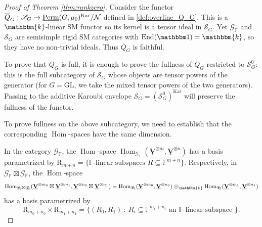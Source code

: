 \documentclass[11pt,a4paper]{amsart}
\theoremstyle{plain}%
\theoremstyle{definition}
\theoremstyle{remark}
\newcommand{\Hom}{\operatorname{Hom}}
\newcommand{\triv}{{\mathbbm 1}}
\newcommand{\End}{\operatorname{End}}
\newcommand{\V}{\mathbf{V}}
\newcommand{\Perm}{\underline{{\rm Perm}}}
\newcommand{\F}{{\mathbb F}}
\newcommand{\kk}{\mathbbm{k}}
\newcommand{\Kar}{\mathrm{Kar}}
\newcommand{\N}{\mathcal N}
\begin{document}
\begin{proof}[Proof of Theorem \ref{thm:rankzero}] 


Consider the functor $\overline{Q}_G: \mathscr{S}_G\to \Perm(G, \mu_0)^{\Kar}/\N$ defined in \cref{def:overline_Q_G}. This is a $\kk$-linear SM functor so its kernel is a tensor ideal in $\mathscr{S}_G$. Yet $\mathscr{G}_{\F}$ and $\mathscr{S}_G$ are semisimple rigid SM categories with $\End(\triv)=\kk$, so they have no non-trivial ideals. Thus $\overline{Q}_G$ is faithful.

To prove that $\overline{Q}_G$ is full, it is enough to {prove} the fullness of $ \overline{Q}_G$ restricted to $\mathscr{S}_G^0$: this is the full subcategory of $\mathscr{S}_G$ whose objects are tensor powers of the generator (for $G=\mathrm{GL}$, we take the mixed tensor powers of the two generators). Passing to the additive Karoubi envelope $ \mathscr{S}_G=(\mathscr{S}_G^0)^{\Kar}$ will preserve the fullness of the functor.

To prove fullness on the above subcategory, we need to establish that the corresponding $\Hom$-spaces have the same dimension. 

In the category $ \mathscr{G}_{\F}$, the $\Hom$-space $\Hom_{\mathscr{G}_{\F}}(\underline{\V}^{\otimes m},
\underline{\V}^{\otimes n})$ has a basis parametrized by $\mathrm{R}_{m+n}=\{\F\text{-linear subspaces } R\subseteq \F^{m+n}\}$. Respectively, in $ \mathscr{G}_{\F}\boxtimes\mathscr{G}_{\F}$, the $\Hom$-space $$\Hom_{\mathscr{G}_{\F}\boxtimes\mathscr{G}_{\F}}(\underline{\V}^{\otimes m_0}\boxtimes\underline{\V}^{\otimes m_1},
\underline{\V}^{\otimes n_0} \boxtimes \underline{\V}^{\otimes n_1}) = \Hom_{\mathscr{G}_{\F}}(\underline{\V}^{\otimes m_0}, \underline{\V}^{\otimes n_0})\otimes_{\kk}
 \Hom_{\mathscr{G}_{\F}}( \underline{\V}^{\otimes m_1}, \underline{\V}^{\otimes n_1}) $$ has a basis parametrized by $$\mathrm{R}_{m_0+n_0}\times \mathrm{R}_{m_1+n_1}=\{(R_0, R_1)~:~ R_i\subseteq \F^{m_i+n_i} \text{ an } \F\text{-linear subspace }\}.$$


\end{proof}
\end{document}
